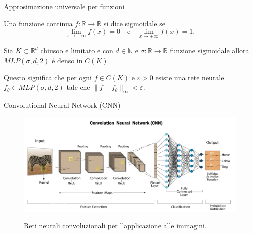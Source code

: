 \documentclass{beamer}
\newcommand{\numberset}{\mathbb}
\newcommand{\N}{\numberset{N}}
\newcommand{\R}{\numberset{R}}
\begin{document}
\begin{frame}{Approsimazione universale per funzioni}
    \begin{definition}
        Una funzione continua $f: \R \to \R$ si dice sigmoidale se 
        \[ \lim_{x \to -\infty} f(x) = 0  \quad \text{e} \quad  \lim_{x \to +\infty} f(x) = 1. \]
    \end{definition}
    \pause
    \begin{theorem}
        Sia $K \subset \R^{d}$ chiusoo e limitato e con $d \in \N$ e $\sigma: \R \to \R$ funzione sigmoidale allora $MLP(\sigma, d, 2)$ \'e denso in $C(K)$.
    
    \end{theorem}
    Questo significa che per ogni $f \in C(K)$ e $\varepsilon > 0$ esiste una rete neurale $f_{\theta} \in MLP(\sigma, d, 2)$ tale che $\|f - f_{\theta}\|_{\infty} < \varepsilon$.
\end{frame}

\begin{frame}{Convolutional Neural Network (CNN)}
\begin{figure}
    \begin{minipage}{0.7\textwidth}
        \centering
        \includegraphics[width=\textwidth]{architectures/CNN.png}
    \end{minipage}%
    \begin{minipage}{0.3\textwidth}
        \centering
        Reti neurali convoluzionali per l'applicazione alle immagini.
    \end{minipage}
\end{figure}
\end{frame}
\end{document}
